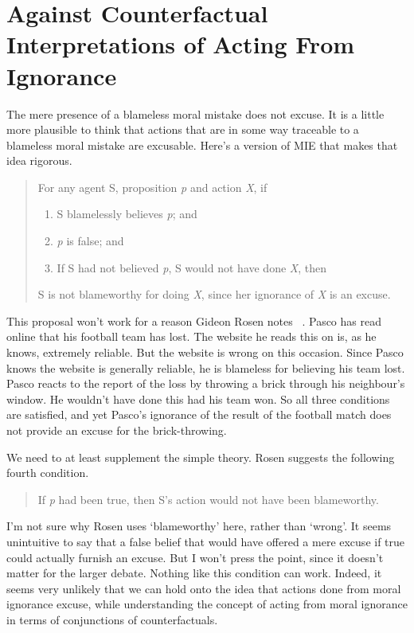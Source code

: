 \section{Against Counterfactual Interpretations of Acting From Ignorance}
\label{againstcounterfactualinterpretationsofactingfromignorance}

The mere presence of a blameless moral mistake does not excuse. It is a little more plausible to think that actions that are in some way traceable to a blameless moral mistake are excusable. Here's a version of MIE that makes that idea rigorous.

\begin{quote}
For any agent S, proposition \emph{p} and action \emph{X}, if

\begin{enumerate}
\item{} S blamelessly believes \emph{p}; and

\item{} \emph{p} is false; and

\item{} If S had not believed \emph{p}, S would not have done \emph{X}, then

\end{enumerate}
S is not blameworthy for doing \emph{X}, since her ignorance of \emph{X} is an excuse.
\end{quote}
This proposal won't work for a reason Gideon Rosen notes ~\citep[63n4]{Rosen2003}. \gls{Pasco} has read online that his football team has lost. The website he reads this on is, as he knows, extremely reliable. But the website is wrong on this occasion. Since \gls{Pasco} knows the website is generally reliable, he is blameless for believing his team lost. \gls{Pasco} reacts to the report of the loss by throwing a brick through his neighbour's window. He wouldn't have done this had his team won. So all three conditions are satisfied, and yet \gls{Pasco}'s ignorance of the result of the football match does not provide an excuse for the brick-throwing.

We need to at least supplement the simple theory. Rosen suggests the following fourth condition.

\begin{quote}
If \emph{p} had been true, then S's action would not have been blameworthy. ~\citep[63n4]{Rosen2003}
\end{quote}
I'm not sure why Rosen uses `blameworthy' here, rather than `wrong'. It seems unintuitive to say that a false belief that would have offered a mere excuse if true could actually furnish an excuse. But I won't press the point, since it doesn't matter for the larger debate. Nothing like this condition can work. Indeed, it seems very unlikely that we can hold onto the idea that actions done from moral ignorance excuse, while understanding the concept of acting from moral ignorance in terms of conjunctions of counterfactuals.

